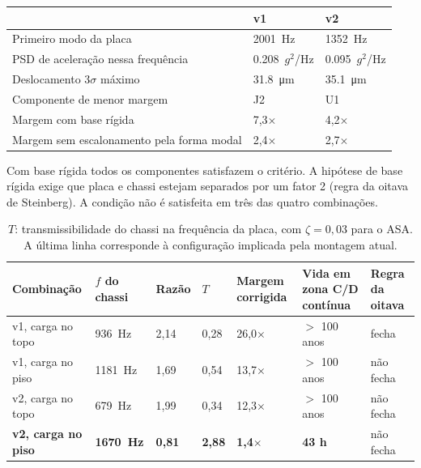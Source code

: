 \documentclass[10pt,a4paper,landscape]{article}
\newcommand{\ok}{\textsf{fecha}}
\newcommand{\nok}{\textsf{não fecha}}
\begin{document}
\begin{table}[H]\footnotesize
\begin{tabularx}{\textwidth}{@{}Y{1.2} Y{0.9} Y{0.9}@{}}
\toprule
 & \textbf{v1} & \textbf{v2} \\
\midrule
Primeiro modo da placa & \SI{2001}{\hertz} & \SI{1352}{\hertz} \\
PSD de aceleração nessa frequência\footnotemark[1] & \num{0.208}~$g^{2}$/Hz & \num{0.095}~$g^{2}$/Hz \\
Deslocamento $3\sigma$ máximo & \SI{31.8}{\micro\meter} & \SI{35.1}{\micro\meter} \\
Componente de menor margem & J2 & U1 \\
Margem com base rígida & 7,3$\times$ & 4,2$\times$ \\
Margem sem escalonamento pela forma modal & 2,4$\times$ & 2,7$\times$ \\
\bottomrule
\end{tabularx}
\end{table}

Com base rígida todos os componentes satisfazem o critério. A hipótese de base rígida exige que placa e chassi estejam separados por um fator 2 (regra da oitava de Steinberg). A condição não é satisfeita em três das quatro combinações.

\begin{table}[H]\footnotesize
\begin{tabularx}{\textwidth}{@{}Y{1.500} Y{0.875} Y{0.750} Y{0.750} Y{1.000} Y{1.125} Y{1.000}@{}}
\toprule
\textbf{Combinação} & \textbf{$f$ do chassi} & \textbf{Razão} & \textbf{$T$} & \textbf{Margem corrigida} & \textbf{Vida em zona C/D contínua} & \textbf{Regra da oitava} \\
\midrule
v1, carga no topo & \SI{936}{\hertz}  & 2,14 & 0,28 & 26,0$\times$ & $>$ 100 anos & \ok \\
v1, carga no piso & \SI{1181}{\hertz} & 1,69 & 0,54 & 13,7$\times$ & $>$ 100 anos & \nok \\
v2, carga no topo & \SI{679}{\hertz}  & 1,99 & 0,34 & 12,3$\times$ & $>$ 100 anos & \nok \\
\textbf{v2, carga no piso} & \textbf{\SI{1670}{\hertz}} & \textbf{0,81} & \textbf{2,88} & \textbf{1,4$\times$} & \textbf{43 h} & \nok \\
\bottomrule
\end{tabularx}
\caption*{\footnotesize $T$: transmissibilidade do chassi na frequência da placa, com $\zeta=0{,}03$ para o ASA. A última linha corresponde à configuração implicada pela montagem atual.}
\end{table}
\end{document}
